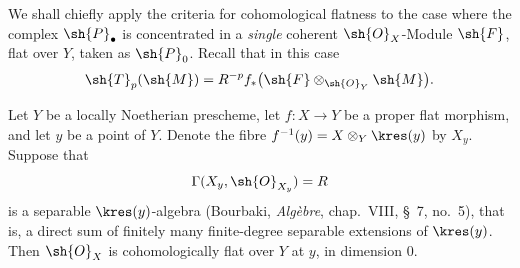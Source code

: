 We shall chiefly apply the criteria for cohomological
flatness to the case where the complex $\sh{P}_\bullet$ is
concentrated in a \emph{single} coherent
$\sh{O}_X$-Module $\sh{F}$, flat over $Y$, taken as
$\sh{P}_0$.  Recall that in this case
\[
  \sh{T}_p(\sh{M})
  =R^{-p}f_*
    \bigl(\sh{F}\otimes_{\sh{O}_Y}\sh{M}\bigr).
\]

\begin{proposition}[7.8.6]
\label{III.7.8.6}
Let $Y$ be a locally Noetherian prescheme, let
$f:X\to Y$ be a proper flat morphism, and let $y$ be a point
of $Y$.  Denote the fibre
$f^{-1}(y)=X\otimes_Y\kres(y)$ by $X_y$.  Suppose that
\[
  \Gamma(X_y,\sh{O}_{X_y})=R
\]
is a separable $\kres(y)$-algebra (Bourbaki,
\emph{Alg\`ebre}, chap.~VIII, \S~7, no.~5), that is, a
direct sum of finitely many finite-degree separable
extensions of $\kres(y)$.  Then $\sh{O}_X$ is
cohomologically flat over $Y$ at $y$, in dimension $0$.
\end{proposition}

